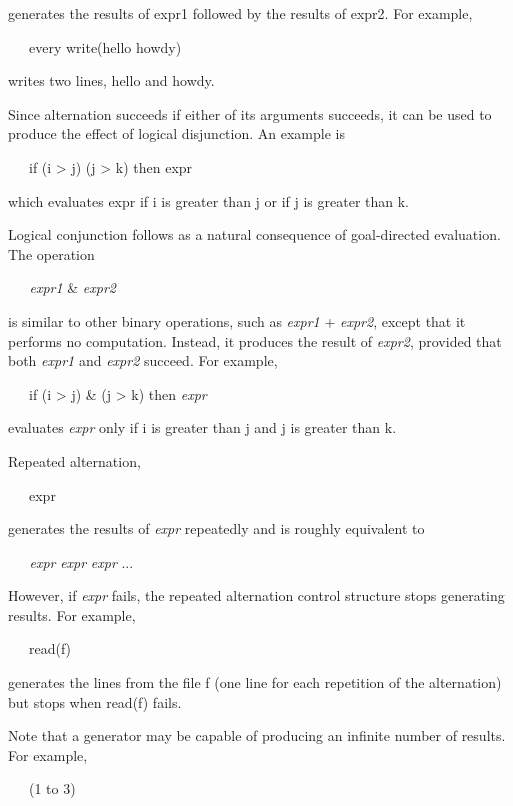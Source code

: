 \noindent
generates the results of expr1 followed by the results of expr2. For example,

{\ttfamily\mdseries
\ \ \ every write({\textquotedbl}hello{\textquotedbl} {\textbar} {\textquotedbl}howdy{\textquotedbl})}

\noindent writes two lines, hello and howdy.

Since alternation succeeds if either of its arguments succeeds, it can
be used to produce the effect of logical disjunction. An example is

{\ttfamily\mdseries
\ \ \ if (i {\textgreater} j) {\textbar} (j {\textgreater} k) then expr}

\noindent
which evaluates expr if i is greater than j or if j is greater than k.

Logical conjunction follows as a natural consequence of goal-directed
evaluation. The operation

{\ttfamily\mdseries
\textit{\ \ \ expr1 }\& \textit{expr2}}

\noindent is similar to other binary operations, such as
\textit{expr1} + \textit{expr2}, except that it performs no
computation. Instead, it produces the result of \textit{expr2},
provided that both
\textit{expr1} and \textit{expr2} succeed. For example,

{\ttfamily\mdseries
\ \ \ if (i {\textgreater} j) \& (j {\textgreater} k) then \textit{expr}}

\noindent
evaluates \textit{expr} only if i is greater than j and j is greater than k.

Repeated alternation,

{\ttfamily\mdseries
\ \ \ {\textbar}expr}

\noindent
generates the results of \textit{expr }repeatedly and is roughly equivalent to

{\ttfamily\mdseries
\textit{\ \ \ expr }{\textbar} \textit{expr }{\textbar} \textit{expr }{\textbar} ...}

However, if \textit{expr} fails, the repeated alternation control
structure stops generating results. For example,

{\ttfamily\mdseries
\ \ \ {\textbar}read(f)}

\noindent generates the lines from the file f (one line for each
repetition of the alternation) but stops when read(f) fails.

Note that a generator may be capable of producing an infinite number
of results. For example,

{\ttfamily\mdseries
\ \ \ {\textbar}(1 to 3)}

